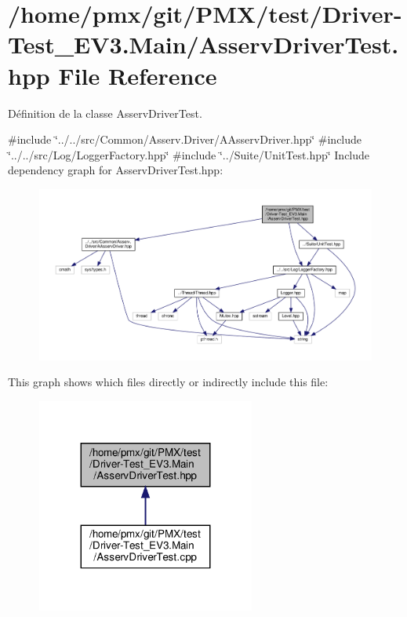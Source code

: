 \hypertarget{Driver-Test__EV3_8Main_2AsservDriverTest_8hpp}{}\section{/home/pmx/git/\+P\+M\+X/test/\+Driver-\/\+Test\+\_\+\+E\+V3.Main/\+Asserv\+Driver\+Test.hpp File Reference}
\label{Driver-Test__EV3_8Main_2AsservDriverTest_8hpp}


Définition de la classe Asserv\+Driver\+Test.  


{\ttfamily \#include \char`\"{}../../src/\+Common/\+Asserv.\+Driver/\+A\+Asserv\+Driver.\+hpp\char`\"{}}\newline
{\ttfamily \#include \char`\"{}../../src/\+Log/\+Logger\+Factory.\+hpp\char`\"{}}\newline
{\ttfamily \#include \char`\"{}../\+Suite/\+Unit\+Test.\+hpp\char`\"{}}\newline
Include dependency graph for Asserv\+Driver\+Test.\+hpp\+:
\nopagebreak
\begin{figure}[H]
\begin{center}
\leavevmode
\includegraphics[width=350pt]{Driver-Test__EV3_8Main_2AsservDriverTest_8hpp__incl}
\end{center}
\end{figure}
This graph shows which files directly or indirectly include this file\+:
\nopagebreak
\begin{figure}[H]
\begin{center}
\leavevmode
\includegraphics[width=203pt]{Driver-Test__EV3_8Main_2AsservDriverTest_8hpp__dep__incl}
\end{center}
\end{figure}
